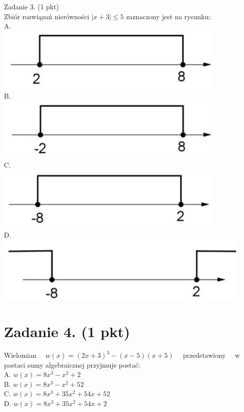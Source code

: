\documentclass[10pt]{article}
\begin{document}
Zadanie 3. (1 pkt)\\
Zbiór rozwiązań nierówności \(|x+3| \leq 5\) zaznaczony jest na rysunku:\\
A.\\
\includegraphics[max width=\textwidth, center]{2024_11_21_b31e6de468170710de69g-02(1)}\\
B.\\
\includegraphics[max width=\textwidth, center]{2024_11_21_b31e6de468170710de69g-02}\\
C.\\
\includegraphics[max width=\textwidth, center]{2024_11_21_b31e6de468170710de69g-02(3)}\\
D.\\
\includegraphics[max width=\textwidth, center]{2024_11_21_b31e6de468170710de69g-02(2)}

\section*{Zadanie 4. (1 pkt)}
Wielomian \(\quad w(x)=(2 x+3)^{3}-(x-5)(x+5) \quad\) przedstawiony \(\quad \mathrm{w}\) postaci sumy algebraicznej przyjmuje postać:\\
A. \(w(x)=8 x^{3}-x^{2}+2\)\\
B. \(w(x)=8 x^{3}-x^{2}+52\)\\
C. \(w(x)=8 x^{3}+35 x^{2}+54 x+52\)\\
D. \(w(x)=8 x^{3}+35 x^{2}+54 x+2\)
\end{document}

